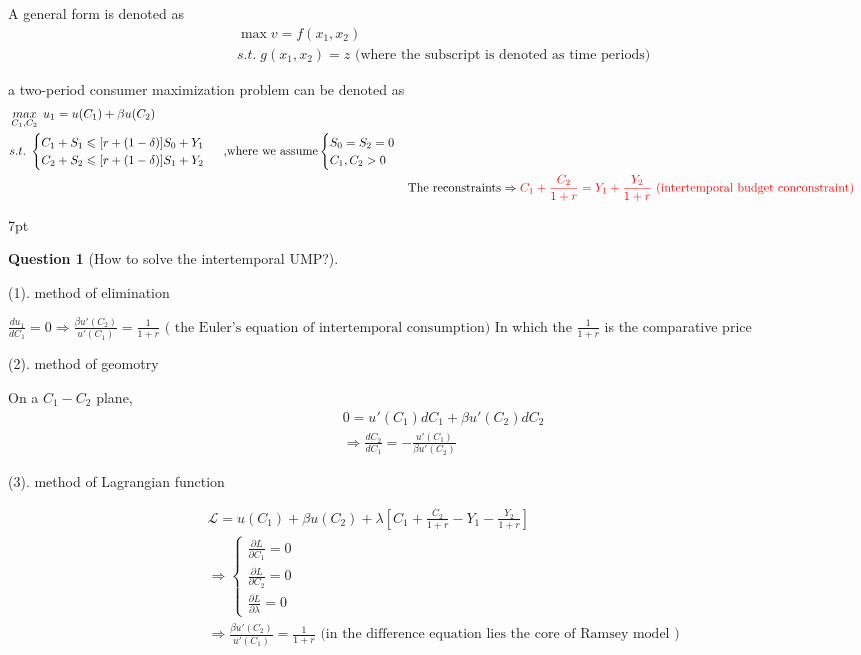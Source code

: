 \documentclass{article}
\newenvironment{redblock}{
\def\FrameCommand{
  \hspace{1pt}
    {\color{LightCoral}
    \vrule width 2pt}
    {\color{redshade}
    \vrule width 4pt}
  \colorbox{redshade}
}
\MakeFramed{
  \advance
  \hsize-
  \width
  \FrameRestore}
\noindent\hspace{-4.55pt}%
\begin{adjustwidth}{}{7pt}
\vspace{2pt}\vspace{2pt}
}
{\vspace{2pt}\end{adjustwidth}\endMakeFramed}
\newtheorem{question}{Question}
\begin{document}
A general form is denoted as
\begin{equation}
\begin{split}
&\max v=f(x_1,x_2)
\\&s.t. \; g(x_{1},x_{2})=z \text{ (where the subscript is denoted as time periods)}
\end{split}
\end{equation}


a two-period consumer maximization problem can be denoted as
\begin{align}
\begin{split}
&\mathop{max}_{C_{1},C_{2}} \; u_{1}=u(C_{1})+\beta u(C_{2})
\\&s.t. \; \begin{cases}
C_{1}+S_{1}\leqslant [r+(1-\delta)]S_{0} +Y_{1} \\
C_{2}+S_{2}\leqslant [r+(1-\delta)]S_{1}+Y_{2}\end{cases}\text{ ,where we assume}\begin{cases}
S_{0}=S_{2}=0 \\
C_{1},C_{2}>0\end{cases} 
\end{split}
\\& \text{The reconstraints}\Rightarrow \color{red} C_{1}+\frac{C_{2}}{1+r}=Y_{1}+\frac{Y_{2}}{1+r} \text{ (intertemporal budget conconstraint)}
\end{align}


\begin{redblock}
\begin{question}[How to solve the intertemporal UMP?]
\end{question}


(1). method of elimination

$\frac{du_{1}}{dC_{1}}=0 \Rightarrow \frac{\beta u'(C_{2})}{u'(C_{1})}=\frac{1}{1+r} \text{ ( the Euler's equation of intertemporal consumption)}$
In which the $\frac{1}{1+r}$ is the comparative price

(2). method of geomotry 

On a $C_{1}-C_{2}$ plane, \begin{align}
&0=u'(C_{1})dC_{1}+\beta u'(C_{2})dC_{2}
\\&\Rightarrow \frac{dC_{2}}{dC_{1}}=-\frac{u'(C_{1})}{\beta u'(C_{2})}
\end{align}

(3). method of Lagrangian function 

\begin{align}
& \mathscr{L}=u(C_{1})+\beta u(C_{2})+\lambda[C_{1}+\frac{C_{2}}{1+r}-Y_{1}-\frac{Y_{2}}{1+r}]
\\&\Rightarrow  \begin{cases}
\frac{\partial L}{\partial C_{1}}=0 \\
\frac{\partial L }{\partial  C_{2}}=0 \\
\frac{\partial L}{\partial \lambda}=0\end{cases}
\\&\Rightarrow \frac{\beta u'(C_{2})}{u'(C_{1})}=\frac{1}{1+r} \text{ (in the difference equation lies the core of Ramsey model )}
\end{align}
\end{redblock}
\end{document}
